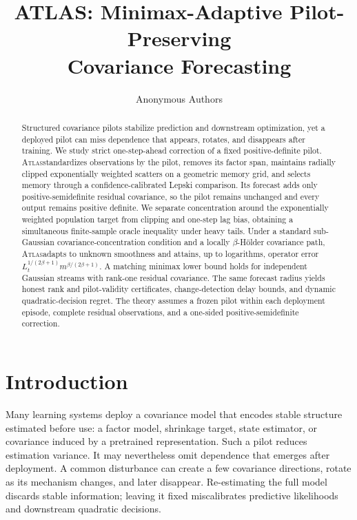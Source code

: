 \documentclass{article}
\title{\textbf{ATLAS: Minimax-Adaptive Pilot-Preserving\\Covariance Forecasting}}
\author{Anonymous Authors}
\theoremstyle{definition}
\theoremstyle{remark}
\newcommand{\ATLAS}{\textsc{Atlas}}
\begin{document}
\maketitle

\begin{abstract}
Structured covariance pilots stabilize prediction and downstream optimization, yet a deployed pilot can miss dependence that appears, rotates, and disappears after training. We study strict one-step-ahead correction of a fixed positive-definite pilot. \ATLAS standardizes observations by the pilot, removes its factor span, maintains radially clipped exponentially weighted scatters on a geometric memory grid, and selects memory through a confidence-calibrated Lepski comparison. Its forecast adds only positive-semidefinite residual covariance, so the pilot remains unchanged and every output remains positive definite. We separate concentration around the exponentially weighted population target from clipping and one-step lag bias, obtaining a simultaneous finite-sample oracle inequality under heavy tails. Under a standard sub-Gaussian covariance-concentration condition and a locally $\beta$-H\"older covariance path, \ATLAS adapts to unknown smoothness and attains, up to logarithms, operator error $L_t^{1/(2\beta+1)}m^{\beta/(2\beta+1)}$. A matching minimax lower bound holds for independent Gaussian streams with rank-one residual covariance. The same forecast radius yields honest rank and pilot-validity certificates, change-detection delay bounds, and dynamic quadratic-decision regret. The theory assumes a frozen pilot within each deployment episode, complete residual observations, and a one-sided positive-semidefinite correction.
\end{abstract}

\section{Introduction}

Many learning systems deploy a covariance model that encodes stable structure estimated before use: a factor model, shrinkage target, state estimator, or covariance induced by a pretrained representation. Such a pilot reduces estimation variance. It may nevertheless omit dependence that emerges after deployment. A common disturbance can create a few covariance directions, rotate as its mechanism changes, and later disappear. Re-estimating the full model discards stable information; leaving it fixed miscalibrates predictive likelihoods and downstream quadratic decisions.
\end{document}
